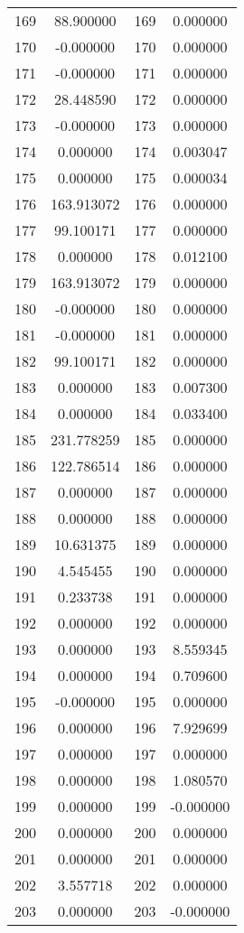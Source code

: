 \documentclass[12pt]{article}
\begin{document}
\begin{longtable}{@{}cccc@{}}
169 & 88.900000 & 169 & 0.000000 \\
170 & -0.000000 & 170 & 0.000000 \\
171 & -0.000000 & 171 & 0.000000 \\
172 & 28.448590 & 172 & 0.000000 \\
173 & -0.000000 & 173 & 0.000000 \\
174 & 0.000000 & 174 & 0.003047 \\
175 & 0.000000 & 175 & 0.000034 \\
176 & 163.913072 & 176 & 0.000000 \\
177 & 99.100171 & 177 & 0.000000 \\
178 & 0.000000 & 178 & 0.012100 \\
179 & 163.913072 & 179 & 0.000000 \\
180 & -0.000000 & 180 & 0.000000 \\
181 & -0.000000 & 181 & 0.000000 \\
182 & 99.100171 & 182 & 0.000000 \\
183 & 0.000000 & 183 & 0.007300 \\
184 & 0.000000 & 184 & 0.033400 \\
185 & 231.778259 & 185 & 0.000000 \\
186 & 122.786514 & 186 & 0.000000 \\
187 & 0.000000 & 187 & 0.000000 \\
188 & 0.000000 & 188 & 0.000000 \\
189 & 10.631375 & 189 & 0.000000 \\
190 & 4.545455 & 190 & 0.000000 \\
191 & 0.233738 & 191 & 0.000000 \\
192 & 0.000000 & 192 & 0.000000 \\
193 & 0.000000 & 193 & 8.559345 \\
194 & 0.000000 & 194 & 0.709600 \\
195 & -0.000000 & 195 & 0.000000 \\
196 & 0.000000 & 196 & 7.929699 \\
197 & 0.000000 & 197 & 0.000000 \\
198 & 0.000000 & 198 & 1.080570 \\
199 & 0.000000 & 199 & -0.000000 \\
200 & 0.000000 & 200 & 0.000000 \\
201 & 0.000000 & 201 & 0.000000 \\
202 & 3.557718 & 202 & 0.000000 \\
203 & 0.000000 & 203 & -0.000000 \\

\end{longtable}
\end{document}
